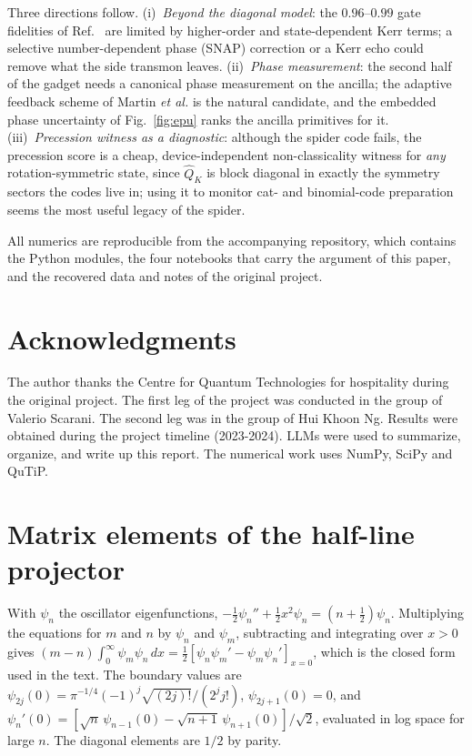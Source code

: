 \documentclass[aps,pra,reprint,superscriptaddress,amsmath,amssymb,nofootinbib]{revtex4-2}
\newenvironment{acknowledgments}{\section*{Acknowledgments}}{}
\begin{document}
Three directions follow. (i)~\emph{Beyond the diagonal model}: the
$0.96$--$0.99$ gate fidelities of Ref.~\cite{qin2026} are limited by
higher-order and state-dependent Kerr terms; a selective number-dependent
phase (SNAP) correction or a Kerr echo could remove what the side transmon
leaves. (ii)~\emph{Phase measurement}: the second half of the gadget needs a canonical phase
measurement on the ancilla; the adaptive feedback scheme of Martin
\emph{et al.} \cite{martin2020} is the natural candidate, and the embedded
phase uncertainty of Fig.~\ref{fig:epu} ranks the ancilla primitives for it.
(iii)~\emph{Precession witness as a diagnostic}: although the spider code
fails, the precession score is a cheap, device-independent non-classicality
witness for \emph{any} rotation-symmetric state, since $\hat Q_K$ is block
diagonal in exactly the symmetry sectors the codes live in; using it to
monitor cat- and binomial-code preparation seems the most useful legacy of the
spider.

All numerics are reproducible from the accompanying repository, which contains
the Python modules, the four notebooks that carry the argument of this paper,
and the recovered data and notes of the original project.

\begin{acknowledgments}
The author thanks the Centre for Quantum Technologies for hospitality during
the original project. The first leg of the project was conducted in the group of Valerio Scarani. The second leg was in the group of Hui Khoon Ng. Results were obtained during the project timeline (2023-2024). LLMs were used to summarize, organize, and write up this report. The numerical work uses NumPy, SciPy and QuTiP.
\end{acknowledgments}

\appendix
\section{Matrix elements of the half-line projector}\label{app:pos}
With $\psi_n$ the oscillator eigenfunctions, $-\tfrac12\psi_n''+\tfrac12x^2\psi_n=(n+\tfrac12)\psi_n$.
Multiplying the equations for $m$ and $n$ by $\psi_n$ and $\psi_m$, subtracting and
integrating over $x>0$ gives
$(m-n)\int_0^\infty\psi_m\psi_n\,dx=\tfrac12\left[\psi_n\psi_m'-\psi_m\psi_n'\right]_{x=0}$,
which is the closed form used in the text. The boundary values are
$\psi_{2j}(0)=\pi^{-1/4}(-1)^j\sqrt{(2j)!}/(2^jj!)$, $\psi_{2j+1}(0)=0$, and
$\psi_n'(0)=[\sqrt n\,\psi_{n-1}(0)-\sqrt{n+1}\,\psi_{n+1}(0)]/\sqrt2$, evaluated in log
space for large $n$. The diagonal elements are $1/2$ by parity.
\end{document}
